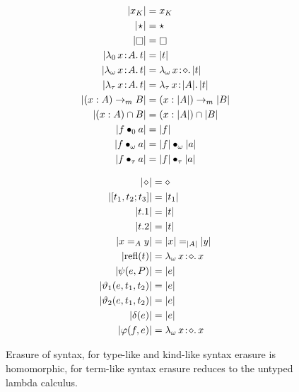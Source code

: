 

\begin{figure}
    \centering
    \begin{minipage}{0.5\textwidth}
        \begin{align*}
            |x_K| &= x_K \\
            |\!\star\!| &= \star \\
            |\kind| &= \kind \\
            |\abs{\lambda_0}{x}{A}{t}| &= |t| \\
            |\abs{\lambda_\omega}{x}{A}{t}| &= \abs{\lambda_\omega}{x}{\diamond}{|t|} \\
            |\abs{\lambda_\tau}{x}{A}{t}| &= \abs{\lambda_\tau}{x}{|A|}{|t|} \\
            |(x:A) \to_m B| &= (x:|A|) \to_m |B| \\
            |(x:A) \cap B| &= (x:|A|) \cap |B| \\
            |\app{f}{0}{a}| &= |f| \\
            |\app{f}{\omega}{a}| &= \app{|f|}{\omega}{|a|} \\
            |\app{f}{\tau}{a}| &= \app{|f|}{\tau}{|a|}
        \end{align*}
    \end{minipage}%
    \begin{minipage}{0.5\textwidth}
        \begin{align*}
            |\!\diamond\!| &= \diamond \\
            |[t_1, t_2; t_3]| &= |t_1| \\
            |t.1| &= |t| \\
            |t.2| &= |t| \\
            |x =_A y| &= |x| =_{|A|} |y| \\
            |\text{refl}(t)| &= {\lambda_\omega}\, x\! : \! \diamond.\, x \\
            |\psi(e, P)| &= |e| \\
            |\vartheta_1(e, t_1, t_2)| &= |e| \\
            |\vartheta_2(e, t_1, t_2)| &= |e| \\
            |\delta(e)| &= |e| \\
            |\varphi(f,e)| &= {\lambda_\omega}\, x\! : \! \diamond.\, x
        \end{align*}
    \end{minipage}
    \caption{Erasure of syntax, for type-like and kind-like syntax erasure is homomorphic, for term-like syntax erasure reduces to the untyped lambda calculus.}
    \label{fig:2:erasure}
\end{figure}

